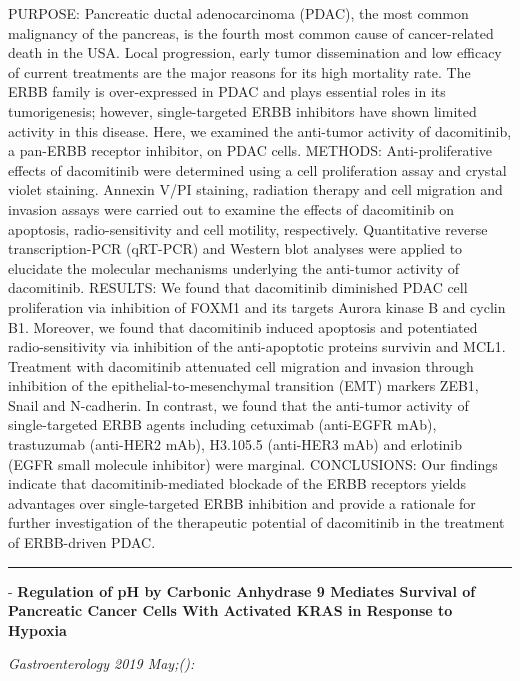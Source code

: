 \documentclass[]{article}
\begin{document}
PURPOSE: Pancreatic ductal adenocarcinoma (PDAC), the most common
malignancy of the pancreas, is the fourth most common cause of
cancer-related death in the USA. Local progression, early tumor
dissemination and low efficacy of current treatments are the major
reasons for its high mortality rate. The ERBB family is over-expressed
in PDAC and plays essential roles in its tumorigenesis; however,
single-targeted ERBB inhibitors have shown limited activity in this
disease. Here, we examined the anti-tumor activity of dacomitinib, a
pan-ERBB receptor inhibitor, on PDAC cells. METHODS: Anti-proliferative
effects of dacomitinib were determined using a cell proliferation assay
and crystal violet staining. Annexin V/PI staining, radiation therapy
and cell migration and invasion assays were carried out to examine the
effects of dacomitinib on apoptosis, radio-sensitivity and cell
motility, respectively. Quantitative reverse transcription-PCR (qRT-PCR)
and Western blot analyses were applied to elucidate the molecular
mechanisms underlying the anti-tumor activity of dacomitinib. RESULTS:
We found that dacomitinib diminished PDAC cell proliferation via
inhibition of FOXM1 and its targets Aurora kinase B and cyclin B1.
Moreover, we found that dacomitinib induced apoptosis and potentiated
radio-sensitivity via inhibition of the anti-apoptotic proteins survivin
and MCL1. Treatment with dacomitinib attenuated cell migration and
invasion through inhibition of the epithelial-to-mesenchymal transition
(EMT) markers ZEB1, Snail and N-cadherin. In contrast, we found that the
anti-tumor activity of single-targeted ERBB agents including cetuximab
(anti-EGFR mAb), trastuzumab (anti-HER2 mAb), H3.105.5 (anti-HER3 mAb)
and erlotinib (EGFR small molecule inhibitor) were marginal.
CONCLUSIONS: Our findings indicate that dacomitinib-mediated blockade of
the ERBB receptors yields advantages over single-targeted ERBB
inhibition and provide a rationale for further investigation of the
therapeutic potential of dacomitinib in the treatment of ERBB-driven
PDAC.

{}

{}

\begin{center}\rule{0.5\linewidth}{\linethickness}\end{center}

 - \textbf{Regulation of pH by Carbonic Anhydrase 9 Mediates Survival of
Pancreatic Cancer Cells With Activated KRAS in Response to Hypoxia}

\emph{Gastroenterology 2019 May;():}
\end{document}

